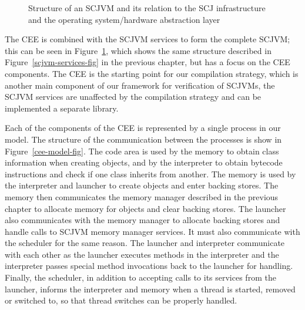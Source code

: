 \begin{figure}[ht]
  \caption{Structure of an SCJVM and its relation to the SCJ
    infrastructure and the operating system/hardware abstraction
    layer}
  \label{cee-fig}
\end{figure}

The CEE is combined with the SCJVM services to form the complete
SCJVM; this can be seen in Figure~\ref{cee-fig}, which shows the same
structure described in Figure~\ref{scjvm-services-fig} in the previous
chapter, but has a focus on the CEE components.
The CEE is the starting point for our compilation strategy, which is
another main component of our framework for verification of SCJVMs,
the SCJVM services are unaffected by the compilation strategy and can
be implemented a separate library.

Each of the components of the CEE is represented by a single \Circus{}
process in our model.
The structure of the communication between the processes is show in
Figure~\ref{cee-model-fig}.
The code area is used by the memory to obtain class information when
creating objects, and by the interpreter to obtain bytecode
instructions and check if one class inherits from another.
The memory is used by the interpreter and launcher to create objects
and enter backing stores.
The memory then communicates the memory manager described in the previous
chapter to allocate memory for objects and clear backing stores.
The launcher also communicates with the memory manager to allocate
backing stores and handle calls to SCJVM memory manager services.
It must also communicate with the scheduler for the same reason.
The launcher and interpreter communicate with each other as the
launcher executes methods in the interpreter and the interpreter
passes special method invocations back to the launcher for handling.
Finally, the scheduler, in addition to accepting calls to its services
from the launcher, informs the interpreter and memory when a thread is
started, removed or switched to, so that thread switches can be
properly handled.


